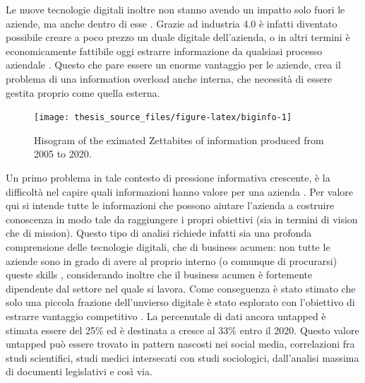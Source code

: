 \documentclass[]{book}
\begin{document}
Le nuove tecnologie digitali inoltre non stanno avendo un impatto solo
fuori le aziende, ma anche dentro di esse
\citep{lasi2014industry, brettel2014virtualization, russmann2015industry}.
Grazie ad industria 4.0 è infatti diventato possibile creare a poco
prezzo un duale digitale dell'azienda, o in altri termini è
economicamente fattibile oggi estrarre informazione da qualsiasi
processo aziendale \citep{davies2015industry}. Questo che pare essere un
enorme vantaggio per le aziende, crea il problema di una information
overload anche interna, che necessità di essere gestita proprio come
quella esterna.

\begin{figure}

{\centering \texttt{[image: thesis\_source\_files/figure-latex/biginfo-1]} 

}

\caption{Hisogram of the eximated Zettabites of information produced from 2005 to 2020.}\label{fig:biginfo}
\end{figure}

Un primo problema in tale contesto di pressione informativa crescente, è
la difficoltà nel capire quali informazioni hanno valore per una azienda
\citep{larose2014discovering, chemchem2015data, kasemsap2015role} . Per
valore qui si intende tutte le informazioni che possono aiutare
l'azienda a costruire conoscenza in modo tale da raggiungere i propri
obiettivi (sia in termini di vision che di mission). Questo tipo di
analisi richiede infatti sia una profonda comprensione delle tecnologie
digitali, che di business acumen: non tutte le aziende sono in grado di
avere al proprio interno (o comunque di procurarsi) queste skills
\citep{hecklau2016holistic, davenport2012data, provost2013data, van2014data},
considerando inoltre che il business acumen è fortemente dipendente dal
settore nel quale si lavora. Come conseguenza è stato stimato che solo
una piccola frazione dell'unvierso digitale è stato esplorato con
l'obiettivo di estrarre vantaggio competitivo \citep{data2012bigger}. La
percenutale di dati ancora untapped è stimata essere del 25\% ed è
destinata a cresce al 33\% entro il 2020. Questo valore untapped può
essere trovato in pattern nascosti nei social media, correlazioni fra
studi scientifici, studi medici intersecati con studi sociologici,
dall'analisi massima di documenti legislativi e così via.
\end{document}
